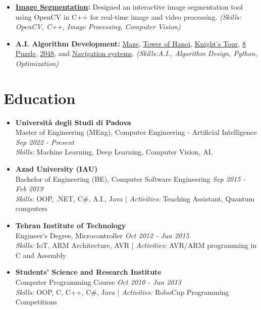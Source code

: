 \documentclass[a4paper]{article}
\begin{document}
\begin{itemize}[left=0pt]
    \item \textbf{\href{https://github.com/PooyaNasiri/image-segmenter}{Image Segmentation}:} Designed an interactive image segmentation tool using OpenCV in C++ for real-time image and video processing. \textit{(Skills: OpenCV, C++, Image Processing, Computer Vision)}

   \item \textbf{A.I. Algorithm Development:} 
\href{https://github.com/PooyaNasiri/maze}{Maze}, 
\href{https://github.com/PooyaNasiri/tower-of-hanoi}{Tower of Hanoi}, 
\href{https://github.com/PooyaNasiri/knights-tour}{Knight's Tour}, 
\href{https://github.com/PooyaNasiri/8Puzzle}{8 Puzzle}, 
\href{https://github.com/PooyaNasiri/2048}{2048}, and 
\href{https://github.com/PooyaNasiri/Navigator}{Navigation systems}. 
\textit{(Skills:A.I., Algorithm Design, Python, Optimization)}
\end{itemize}


\section*{Education}
\begin{itemize}[left=0pt]
    \item \textbf{Università degli Studi di Padova} \\
    Master of Engineering (MEng), Computer Engineering - Artificial Intelligence \hfill \textit{Sep 2022 - Present} \\
    \textit{Skills:} Machine Learning, Deep Learning, Computer Vision, AI.
    
    \item \textbf{Azad University (IAU)} \\
    Bachelor of Engineering (BE), Computer Software Engineering \hfill \textit{Sep 2015 - Feb 2019} \\
    \textit{Skills:} OOP, .NET, C\#, A.I., Java  |  \textit{Activities:} Teaching Assistant, Quantum computers

    \item \textbf{Tehran Institute of Technology} \\
    Engineer's Degree, Microcontroller \hfill \textit{Oct 2012 - Jun 2015} \\
    \textit{Skills:} IoT, ARM Architecture, AVR  | \textit{Activities:} AVR/ARM programming in C and Assembly

    \item \textbf{Students' Science and Research Institute} \\
    Computer Programming Course \hfill \textit{Oct 2010 - Jun 2013} \\
    \textit{Skills:} OOP, C, C++, C\#, Java  | \textit{Activities:} RoboCup Programming Competitions
\end{itemize}
\end{document}
